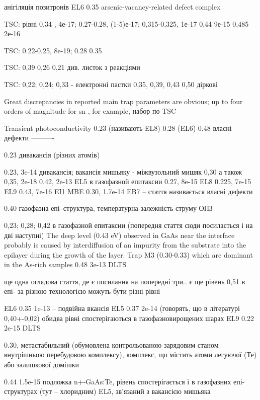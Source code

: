 \documentclass[a4paper,14pt,oneside,openany]{memoir}
\begin{document}
анігіляція позитронів
EL6
0.35 arsenic-vacancy-related defect complex \cite{EL6:Kuisma}

TSC:
рівні 0,34 , 4е-17;
0.27-0.28, (1-5)е-17;
0,315-0,325, 1е-17
0,44 9е-15
0,485 2е-16\cite{Pavlovic:GaAs}

TSC:
0.22-0.25, 8e-19;
0.28
0.35\cite{Lin:GaAs}

TSC:
0,39
0,26
0,21
див. листок з реакціями \cite{FANG1990}

TSC:
0,22; 0,24; 0,33 - електронні пастки
0,35, 0,39, 0,43 0,50 діркові \cite{Tomozane:GaAs}

Great discrepancies in reported main trap parameters are
obvious; up to four orders of magnitude for sn , for example,
набор по TSC\cite{Pavlovic2000}


Transient photoconductivity
0.23 (називають EL8)
0.28 (EL6)
0.48
власні дефекти \cite{Abele:GaAs}
----------

0.23 дивакансія (різних атомів) \cite{Morrow:EL17}

0.23, 3e-14 дивакансія;
вакансія мишьяку -  міжвузольний мишяк 0,30 а також 0,35, 2e-18
0.42, 2e-13 EL5
в газофазной епитаксии
0.27, 8e-15 EL8
0.225, 7e-15 EL9
0.43, 7e-16 EI1
MBE
0.30, 1.7e-14 EB7  \cite{Bourgoin:GaAs} -- стаття називається власні дефекти

0.40 газофазна епі--структура,
температурна залежність струму ОПЗ \cite{ASHBY:GaAs}

0,23; 0,28; 0,42 в газофазной епитаксии (попередня стаття сюди посилається і на дві наступні) \cite{Mircea1975}
The  deep  level  (0.43 eV) observed in GaAs near the interface probably is caused
by interdiffusion  of  an impurity from  the substrate into the  epilayer  during  the  growth  of the  layer. \cite{Lefevre1977}
Trap M3  (0.30-0.33)  which  are dominant  in the As-rich samples
0.48 3e-13
DLTS \cite{Lang:GaAs}

ще одна оглядова стаття, де є посилання на попередні три.. є ще рівень 0,51 \cite{Martin1977} в епі- за різною технологією можуть бути різні рівні

EL6 0.35 1e-13 -- подвійна вкансія
EL5 0.37 2e-14 (говорять, що в літературі 0,40+-0,02)
обидва рівні спостерігаються в газофазновирощених шарах
EL9 0.22 2e-15
DLTS
\cite{Fang:EL6}


0.30, метастабильний (обумовлена контрольованою зарядовим станом внутрішньою перебудовою комплексу),
комплекс, що містить атоми легуючої (Те) або залишкової домішки \cite{KolFTP1994r}

0.44 1.5e-15 подложка n+-GaAs:Te,
рівень спостерігається і в газофазних епі-структурах (тут -- хлоридним)
EL5, зв'язаний з вакансією мишьяка \cite{KolFTP1989r}
\end{document}
